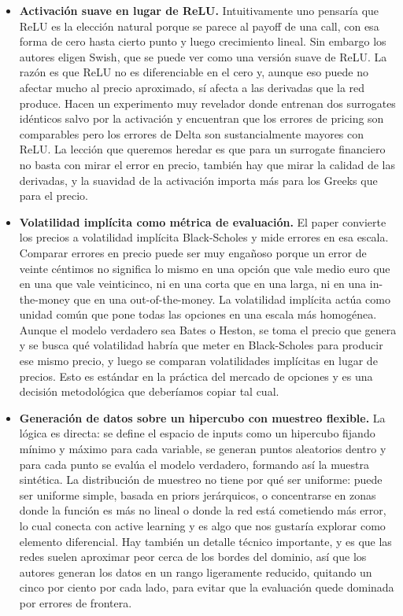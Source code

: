 \documentclass[11pt,a4paper]{article}
\begin{document}
\begin{itemize}
\item \textbf{Activación suave en lugar de ReLU.} Intuitivamente uno pensaría que ReLU es la elección natural porque se parece al payoff de una call, con esa forma de cero hasta cierto punto y luego crecimiento lineal. Sin embargo los autores eligen Swish, que se puede ver como una versión suave de ReLU. La razón es que ReLU no es diferenciable en el cero y, aunque eso puede no afectar mucho al precio aproximado, sí afecta a las derivadas que la red produce. Hacen un experimento muy revelador donde entrenan dos surrogates idénticos salvo por la activación y encuentran que los errores de pricing son comparables pero los errores de Delta son sustancialmente mayores con ReLU. La lección que queremos heredar es que para un surrogate financiero no basta con mirar el error en precio, también hay que mirar la calidad de las derivadas, y la suavidad de la activación importa más para los Greeks que para el precio.

\item \textbf{Volatilidad implícita como métrica de evaluación.} El paper convierte los precios a volatilidad implícita Black-Scholes y mide errores en esa escala. Comparar errores en precio puede ser muy engañoso porque un error de veinte céntimos no significa lo mismo en una opción que vale medio euro que en una que vale veinticinco, ni en una corta que en una larga, ni en una in-the-money que en una out-of-the-money. La volatilidad implícita actúa como unidad común que pone todas las opciones en una escala más homogénea. Aunque el modelo verdadero sea Bates o Heston, se toma el precio que genera y se busca qué volatilidad habría que meter en Black-Scholes para producir ese mismo precio, y luego se comparan volatilidades implícitas en lugar de precios. Esto es estándar en la práctica del mercado de opciones y es una decisión metodológica que deberíamos copiar tal cual.

\item \textbf{Generación de datos sobre un hipercubo con muestreo flexible.} La lógica es directa: se define el espacio de inputs como un hipercubo fijando mínimo y máximo para cada variable, se generan puntos aleatorios dentro y para cada punto se evalúa el modelo verdadero, formando así la muestra sintética. La distribución de muestreo no tiene por qué ser uniforme: puede ser uniforme simple, basada en priors jerárquicos, o concentrarse en zonas donde la función es más no lineal o donde la red está cometiendo más error, lo cual conecta con active learning y es algo que nos gustaría explorar como elemento diferencial. Hay también un detalle técnico importante, y es que las redes suelen aproximar peor cerca de los bordes del dominio, así que los autores generan los datos en un rango ligeramente reducido, quitando un cinco por ciento por cada lado, para evitar que la evaluación quede dominada por errores de frontera.


\end{itemize}
\end{document}
